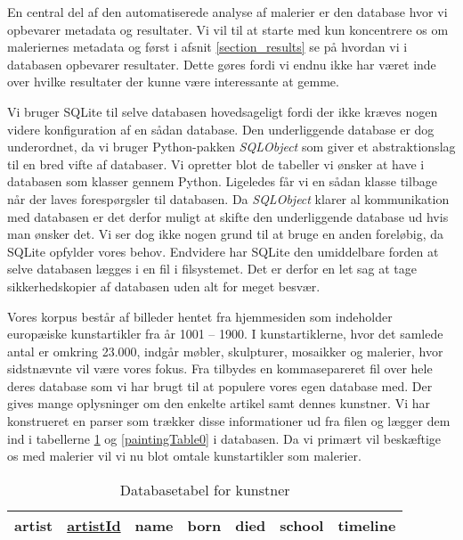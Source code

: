 {
En central del af den automatiserede analyse af malerier er den database
hvor vi opbevarer metadata og resultater. Vi vil til at starte med kun
koncentrere os om maleriernes metadata og først i afsnit
\ref{section_results} se på hvordan vi i databasen opbevarer resultater.
Dette gøres fordi vi endnu ikke har været inde over hvilke resultater
der kunne være interessante at gemme.

Vi bruger SQLite til selve databasen hovedsageligt fordi der ikke kræves
nogen videre konfiguration af en sådan database. Den underliggende
database er dog underordnet, da vi bruger Python-pakken \emph{SQLObject}
som giver et abstraktionslag til en bred vifte af databaser. Vi opretter
blot de tabeller vi ønsker at have i databasen som klasser gennem
Python. Ligeledes får vi en sådan klasse tilbage når der laves
forespørgsler til databasen. Da \emph{SQLObject} klarer al kommunikation
med databasen er det derfor muligt at skifte den underliggende database
ud hvis man ønsker det. Vi ser dog ikke nogen grund til at bruge en
anden foreløbig, da SQLite opfylder vores behov. Endvidere har SQLite
den umiddelbare forden at selve databasen lægges i en fil i filsystemet.
Det er derfor en let sag at tage sikkerhedskopier af databasen uden alt
for meget besvær.

Vores korpus består af billeder hentet fra hjemmesiden \cite{wgahu} som
indeholder europæiske kunstartikler fra år 1001 -- 1900. I
kunstartiklerne, hvor det samlede antal er omkring 23.000, indgår
møbler, skulpturer, mosaikker og malerier, hvor sidstnævnte vil være
vores fokus. Fra \cite{wgahu} tilbydes en kommasepareret fil over hele
deres database som vi har brugt til at populere vores egen database med.
Der gives mange oplysninger om den enkelte artikel samt dennes kunstner.
Vi har konstrueret en parser som trækker disse informationer ud fra
filen og lægger dem ind i tabellerne \ref{artistTable0} og
\ref{paintingTable0} i databasen. Da vi primært vil beskæftige os med
malerier vil vi nu blot omtale kunstartikler som malerier.

\begin{table}[!h]
    \centering
    \begin{tabular}{|l||c|c|c|c|c|c|}
        \hline
        \bf{artist} \hspace{0.5cm} & \underline{artistId} & name & born & died & school & timeline \\\hline
    \end{tabular}
    \caption{Databasetabel for kunstner}
    \label{artistTable0}
\end{table}

}
